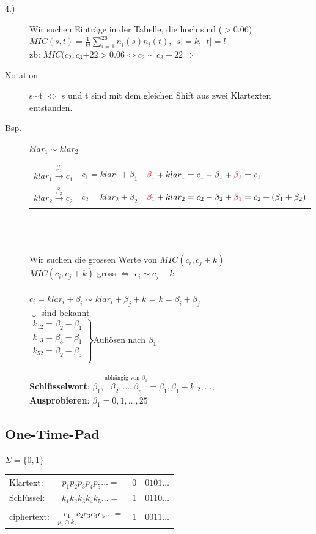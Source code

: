 \documentclass[landscape,twocolumn,a4paper]{article}
\newcommand{\T}[1]{\text{#1}} %
\newcommand{\Ra}{\Rightarrow}
\newcommand{\Abs}[1]{\left| #1 \right|} %
\newcommand{\Brackar}[2]{\left.\begin{array}{#1} #2 \end{array}\right\rbrace} %
\newcommand{\Sum}[2]{\sum_{#2}^{#1}} %
\newcommand{\Oneover}[1]{\frac{1}{#1}} %
\newcommand{\Oben}[2]{\overset{#1}{#2}} %
\newcommand{\Unten}[2]{\underset{#1}{#2}} %
\begin{document}
\begin{description}
	\item[4.)] Wir suchen Einträge in der Tabelle, die hoch sind ($> 0.06$) \\
		$MIC(s,t)=\Oneover{kl}\Sum{26}{i=1}n_i(s)n_i(t)$, $\Abs{s}=k$, $\Abs{t}=l$\\
		zb: $MIC(c_2,c_3{+22} > 0.06 \Longleftrightarrow c_2 \sim c_3+22 \Ra$ \\
	\item[Notation] s$\sim$t $\Longleftrightarrow$ s und t sind mit dem gleichen Shift aus zwei Klartexten entstanden.
	\item[Bsp.] $klar_1 \sim klar_2$ \\
		\begin{tabular}{l | l | l}
			$klar_1 \xrightarrow[]{\beta_1} c_1$ & $c_1 = klar_1+\beta_1$ & ${\color{red}\beta_1}+klar_1=c_1-\beta_1+{\color{red}\beta_1}=c_1$ \\
			$klar_2 \xrightarrow[]{\beta_2} c_2$ & $c_2 = klar_2+\beta_2$ & ${\color{red}\beta_1}+klar_2=c_2-\beta_2+{\color{red}\beta_1}=c_2+(\beta_1+\beta_2)$\\
		\end{tabular} \\ \\ \\
		Wir suchen die grossen Werte von $MIC(c_i, c_j +k)$ \\
		$MIC(c_i, c_j +k)$ gross $\Longleftrightarrow$ $c_i \sim c_j + k$ \\ \\
		$c_i=klar_i+\beta_i$ $\sim$ $klar_i + \beta_j + k$ = {\color{red} $k = \beta_i + \beta_j$ }\\
		
		\hspace*{.2cm}$\downarrow$ sind \underline{bekannt}\\
		$\Brackar{c}{
		k_{12}=\beta_2-\beta_1\\
		k_{13}=\beta_3-\beta_1\\
		k_{52}=\beta_2-\beta_5\\
		}$Auflösen nach $\beta_1$\\\\
		\textbf{Schlüsselwort}: $\beta_1,\Oben{\T{abhängig von }\beta_1}{\beta_2,\dots,\beta_p}=\beta_1,\beta_1+k_{12},\dots,$ \\ 
		\textbf{Ausprobieren}: $\beta_1 = 0,1,\dots, 25$

\end{description}
\subsection{One-Time-Pad}
$\Sigma=\{0,1\}$
\begin{tabular}{lc|c|l}\cline{3-3}
Klartext:& $p_1p_2p_3p_4p_5\dots=$&$0$&$0101\dots$\\
Schlüssel:& $k_1k_2k_3k_4k_5\dots=$&$1$&$0110\dots$\\
ciphertext:& $\Unten{p_1\oplus k_1}{c_1}c_2c_3c_4c_5\dots=$&$1$&$0011\dots$\\\cline{3-3}
\end{tabular}
\end{document}
